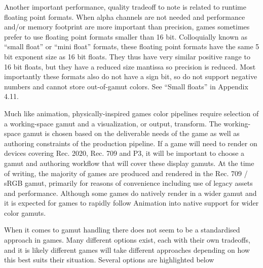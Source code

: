 Another important performance, quality tradeoff to note is related to runtime floating point formats. When alpha channels are not needed and performance and/or memory footprint are more important than precision, games sometimes prefer to use floating point formats smaller than 16 bit. Colloquially known as “small float” or “mini float” formats, these floating point formats have the same 5 bit exponent size as 16 bit floats. They thus have very similar positive range to 16 bit floats, but they have a reduced size mantissa so precision is reduced. Most importantly these formats also do not have a sign bit, so do not support negative numbers and cannot store out-of-gamut colors. See “Small floats” in Appendix 4.11.

Much like animation, physically-inspired games color pipelines require selection of a working-space gamut and a visualization, or output, transform. The working-space gamut is chosen based on the deliverable needs of the game as well as authoring constraints of the production pipeline. If a game will need to render on devices covering Rec. 2020, Rec. 709 and P3, it will be important to choose a gamut and authoring workflow that will cover these display gamuts. At the time of writing, the majority of games are produced and rendered in the Rec. 709 / sRGB gamut, primarily for reasons of convenience including use of legacy assets and performance. Although some games do natively render in a wider gamut and it is expected for games to rapidly follow Animation into native support for wider color gamuts.




When it comes to gamut handling there does not seem to be a standardised approach in games. Many different options exist, each with their own tradeoffs, and it is likely different games will take different approaches depending on how this best suits their situation. Several options are highlighted below

